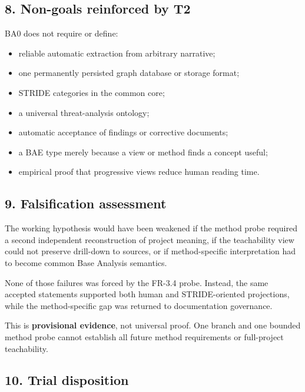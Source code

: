 \documentclass[
  10pt,
  a4paper,
]{article}
\providecommand{\tightlist}{%
  \setlength{\itemsep}{0pt}\setlength{\parskip}{0pt}}
\begin{document}
\subsection{8. Non-goals reinforced by
T2}\label{8-non-goals-reinforced-by-t2}

BA0 does not require or define:

\begin{itemize}
\tightlist
\item
  reliable automatic extraction from arbitrary narrative;
\item
  one permanently persisted graph database or storage format;
\item
  STRIDE categories in the common core;
\item
  a universal threat-analysis ontology;
\item
  automatic acceptance of findings or corrective documents;
\item
  a BAE type merely because a view or method finds a concept useful;
\item
  empirical proof that progressive views reduce human reading time.
\end{itemize}

\subsection{9. Falsification
assessment}\label{9-falsification-assessment}

The working hypothesis would have been weakened if the method probe
required a second independent reconstruction of project meaning, if the
teachability view could not preserve drill-down to sources, or if
method-specific interpretation had to become common Base Analysis
semantics.

None of those failures was forced by the FR-3.4 probe. Instead, the same
accepted statements supported both human and STRIDE-oriented
projections, while the method-specific gap was returned to documentation
governance.

This is \textbf{provisional evidence}, not universal proof. One branch
and one bounded method probe cannot establish all future method
requirements or full-project teachability.

\subsection{10. Trial disposition}\label{10-trial-disposition}
\end{document}
